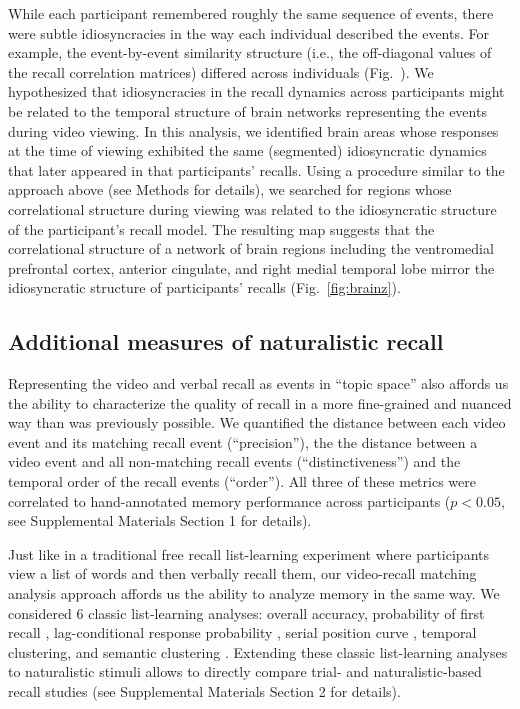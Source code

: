 While each participant remembered roughly the same sequence of events, there were subtle idiosyncracies in the way each individual described the events. For example, the event-by-event similarity structure (i.e., the off-diagonal values of the recall correlation matrices) differed across individuals (Fig.~\corrmats). We hypothesized that idiosyncracies in the recall dynamics across participants might be related to the temporal structure of brain networks representing the events during video viewing. In this analysis, we identified brain areas whose responses at the time of viewing exhibited the same (segmented) idiosyncratic dynamics that later appeared in that participants’ recalls. Using a procedure similar to the approach above (see Methods for details), we searched for regions whose correlational structure during viewing was related to the idiosyncratic structure of the participant's recall model. The resulting map suggests that the correlational structure of a network of brain regions including the ventromedial prefrontal cortex, anterior cingulate, and right medial temporal lobe mirror the idiosyncratic structure of participants' recalls (Fig.~\ref{fig:brainz}).




\subsection*{Additional measures of naturalistic recall}
Representing the video and verbal recall as events in ``topic space'' also affords us the ability to characterize the quality of recall in a more fine-grained and nuanced way than was previously possible. We quantified the distance between each video event and its matching recall event (``precision''), the the distance between a video event and all non-matching recall events (``distinctiveness'') and the temporal order of the recall events (``order''). All three of these metrics were correlated to hand-annotated memory performance across participants ($p < 0.05$, see Supplemental Materials Section 1 for details).

Just like in a traditional free recall list-learning experiment where participants view a list of words and then verbally recall them, our video-recall matching analysis approach affords us the ability to analyze memory in the same way. We considered 6 classic list-learning analyses: overall accuracy, probability of first recall \citep{Hoga75, HowaKaha99, Lami99}, lag-conditional response probability \citep{Kaha96, HowaKaha99}, serial position curve \citep{Murd62a}, temporal clustering, and semantic clustering \citep{HowaKaha02, PolyEtal09}. Extending these classic list-learning analyses to naturalistic stimuli allows to directly compare trial- and naturalistic-based recall studies (see Supplemental Materials Section 2 for details).


